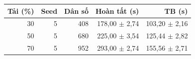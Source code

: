 \small\begin{tabular}{rrrrr}
\toprule
Tải (\%) & Seed & Dân số & Hoàn tất (s) & TB (s)\\\midrule
30 & 5 & 408 & 178,00 $\pm$ 2,74 & 103,20 $\pm$ 2,16\\
50 & 5 & 680 & 225,00 $\pm$ 3,54 & 125,44 $\pm$ 2,82\\
70 & 5 & 952 & 293,00 $\pm$ 2,74 & 155,56 $\pm$ 2,71\\
\bottomrule\end{tabular}
